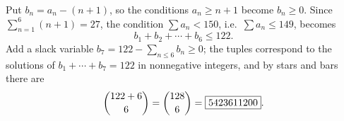 Put $b_n=a_n-(n+1)$, so the conditions $a_n\ge n+1$ become $b_n\ge0$. Since $\sum_{n=1}^{6}(n+1)=27$, the condition $\sum a_n<150$, i.e.\ $\sum a_n\le149$, becomes
\[
b_1+b_2+\cdots+b_6\le122 .
\]
Add a slack variable $b_7=122-\sum_{n\le6}b_n\ge0$; the tuples correspond to the solutions of $b_1+\cdots+b_7=122$ in nonnegative integers, and by stars and bars there are
\[
\dbinom{122+6}{6}=\dbinom{128}{6}=\boxed{5423611200}.
\]

